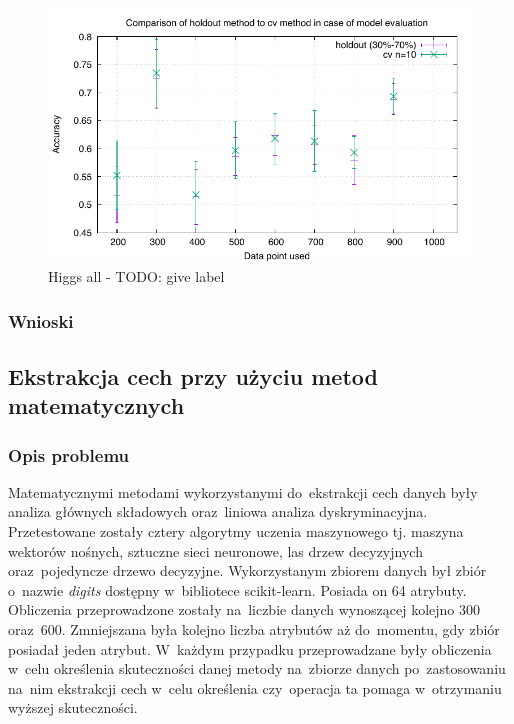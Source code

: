 \begin{figure}
\centering
\includegraphics[scale=\cvsize]{res/cv_tree.pdf}
\caption[Caption for LOF]{Higgs all - TODO: give label\label{higgsall}}
\end{figure}
  


\subsubsection{Wnioski}

\subsection{Ekstrakcja cech przy użyciu metod matematycznych}

\subsubsection{Opis problemu}
Matematycznymi metodami wykorzystanymi do~ekstrakcji cech danych były analiza głównych składowych oraz~liniowa analiza dyskryminacyjna. Przetestowane zostały cztery algorytmy uczenia maszynowego tj. maszyna wektorów nośnych, sztuczne sieci neuronowe, las drzew decyzyjnych oraz~pojedyncze drzewo decyzyjne. Wykorzystanym zbiorem danych był zbiór o~nazwie \textit{digits} dostępny w~bibliotece scikit-learn. Posiada on 64 atrybuty. Obliczenia przeprowadzone zostały na~liczbie danych wynoszącej kolejno 300 oraz~600. Zmniejszana była kolejno liczba atrybutów aż do~momentu, gdy zbiór posiadał jeden atrybut. W~każdym przypadku przeprowadzane były obliczenia w~celu określenia skuteczności danej metody na~zbiorze danych po~zastosowaniu na~nim ekstrakcji cech w~celu określenia czy~operacja ta pomaga w~otrzymaniu wyższej skuteczności.

